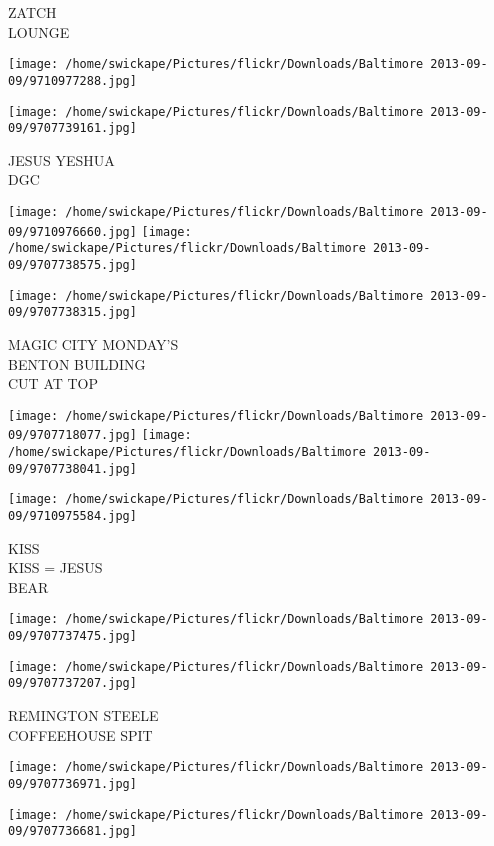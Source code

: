 \documentclass[10pt,letterpaper]{article}
\begin{document}
ZATCH\\
LOUNGE
\pagebreak

\texttt{[image: /home/swickape/Pictures/flickr/Downloads/Baltimore 2013-09-09/9710977288.jpg]}

\vspace{0.25in}
\texttt{[image: /home/swickape/Pictures/flickr/Downloads/Baltimore 2013-09-09/9707739161.jpg]}

JESUS YESHUA\\
DGC
\pagebreak

\texttt{[image: /home/swickape/Pictures/flickr/Downloads/Baltimore 2013-09-09/9710976660.jpg]}
\texttt{[image: /home/swickape/Pictures/flickr/Downloads/Baltimore 2013-09-09/9707738575.jpg]}

\vspace{0.25in}
\texttt{[image: /home/swickape/Pictures/flickr/Downloads/Baltimore 2013-09-09/9707738315.jpg]}

MAGIC CITY MONDAY'S\\
BENTON BUILDING\\
CUT AT TOP
\pagebreak

\texttt{[image: /home/swickape/Pictures/flickr/Downloads/Baltimore 2013-09-09/9707718077.jpg]}
\texttt{[image: /home/swickape/Pictures/flickr/Downloads/Baltimore 2013-09-09/9707738041.jpg]}

\texttt{[image: /home/swickape/Pictures/flickr/Downloads/Baltimore 2013-09-09/9710975584.jpg]}

KISS\\
KISS = JESUS\\
BEAR
\pagebreak

\texttt{[image: /home/swickape/Pictures/flickr/Downloads/Baltimore 2013-09-09/9707737475.jpg]}

\vspace{0.25in}
\texttt{[image: /home/swickape/Pictures/flickr/Downloads/Baltimore 2013-09-09/9707737207.jpg]}

REMINGTON STEELE\\
COFFEEHOUSE SPIT
\pagebreak

\texttt{[image: /home/swickape/Pictures/flickr/Downloads/Baltimore 2013-09-09/9707736971.jpg]}

\vspace{0.25in}
\texttt{[image: /home/swickape/Pictures/flickr/Downloads/Baltimore 2013-09-09/9707736681.jpg]}
\end{document}
